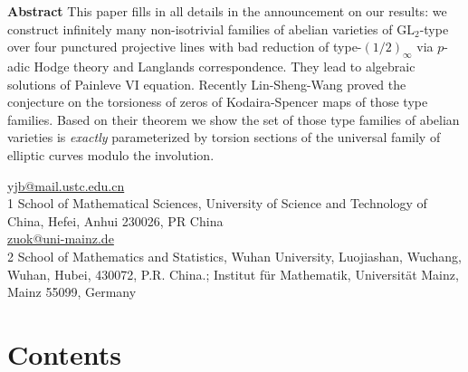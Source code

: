 \documentclass[12pt,twoside]{book}
\makeatletter
\renewcommand{\tableofcontents}{%
\section*{Contents}
\vspace*{-5pt}%
\@starttoc{toc}}
\theoremstyle{plain}
\theoremstyle{definition}
\theoremstyle{remark}
\numberwithin{equation}{section}
\makeatother
\begin{document}
\begin{titlepage}
\begin{flushleft}
\begin{varwidth}{\linewidth}
\textbf{Abstract}\hspace{0.2em}
This paper fills in all details in the announcement \cite{YaZu23a} on our results:
we construct infinitely many non-isotrivial families of abelian varieties of $\text{GL}_2$-type over  four punctured projective lines with bad reduction of type-$(1/2)_\infty$ via $p$-adic Hodge theory and Langlands correspondence. They lead to algebraic solutions of Painleve VI equation. Recently Lin-Sheng-Wang  proved  the conjecture on the torsioness  of zeros of Kodaira-Spencer maps of those type families.  Based on their theorem we show the set of those type families of  abelian varieties is
{\sl exactly } parameterized by torsion sections of the universal family of elliptic curves   modulo the involution.
\end{varwidth}

\vspace{5em}
\vfill

\faEnvelope[regular]\hspace{0.2em} \href{mailto:yjb@mail.ustc.edu.cn}{yjb@mail.ustc.edu.cn} \\[0.5em]
1\hspace{0.8em} School of Mathematical Sciences, University of Science and Technology of China, Hefei, Anhui 230026, PR China\\
\faEnvelope[regular]\hspace{0.2em}  \href{mailto:zuok@uni-mainz.de}{zuok@uni-mainz.de} \\[0.5em]
2\hspace{0.8em} School of Mathematics and Statistics, Wuhan University, Luojiashan, Wuchang, Wuhan, Hubei, 430072, P.R. China.; Institut f\"ur Mathematik, Universit\"at Mainz, Mainz 55099, Germany
\end{flushleft}
\end{titlepage}
\let\cleardoublepage\clearpage
\setcounter{tocdepth}{2}
\tableofcontents\let\cleardoublepage\clearpage
\thispagestyle{fancy}
\newpage
\renewcommand\thesection{\arabic {section}}
\end{document}
